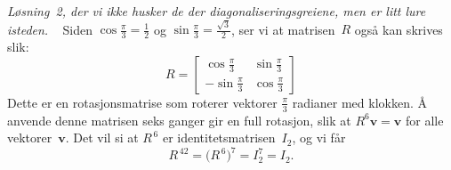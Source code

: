 \documentclass[notitlepage,a4paper,12pt,norsk]{IMFeksamen}
\newcommand{\V}[1]{\mathbf{#1}}
\renewcommand{\v}{\V{v}}
\newcommand{\0}{\V{0}}
\newcommand{\oppgslutt}{
\begin{center}
\pgfornament[width=6cm]{88}
\end{center}
}
\newenvironment{losning}{\begin{oppgave}}{\oppgslutt\end{oppgave}}
\begin{document}
\begin{losning}
\emph{Løsning~2,
der vi ikke husker de der diagonaliseringsgreiene,
men er litt lure isteden.}
\ %
Siden
$\cos \frac{\pi}{3}=\frac{1}{2}$
og
$\sin \frac{\pi}{3}=\frac{\sqrt{3}}{2}$,
ser vi at matrisen~$R$ også kan skrives slik:
\[
R =
\begin{bmatrix}
 \cos \frac{\pi}{3} & \sin \frac{\pi}{3} \\[4pt]
-\sin \frac{\pi}{3} & \cos \frac{\pi}{3}
\end{bmatrix}
\]
Dette er en rotasjonsmatrise som roterer vektorer
$\frac{\pi}{3}$
radianer med klokken.
Å anvende denne matrisen seks ganger gir en full rotasjon,
slik at $R^6 \v = \v$ for alle vektorer~$\v$.
Det vil si at $R^{\,6}$ er identitetsmatrisen~$I_2$,
og vi får
\[
R^{\,42} = \big( R^{\,6} \big)^7 = I_2^7 = I_2.
\]
\end{losning}
\end{document}
